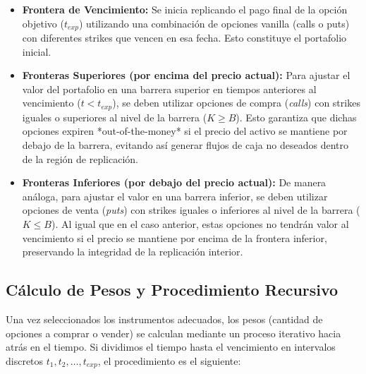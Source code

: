 \begin{itemize} 
  \item \textbf{Frontera de Vencimiento:} Se inicia replicando el pago final de la opción objetivo ($t_{exp}$) utilizando una combinación de opciones vanilla (calls o puts) con diferentes strikes que vencen en esa fecha. Esto constituye el portafolio inicial.
  
  \item \textbf{Fronteras Superiores (por encima del precio actual):} Para ajustar el valor del portafolio en una barrera superior en tiempos anteriores al vencimiento ($t < t_{exp}$), se deben utilizar opciones de compra (\textit{calls}) con strikes iguales o superiores al nivel de la barrera ($K \geq B$). Esto garantiza que dichas opciones expiren *out-of-the-money* si el precio del activo se mantiene por debajo de la barrera, evitando así generar flujos de caja no deseados dentro de la región de replicación.
  \item \textbf{Fronteras Inferiores (por debajo del precio actual):} De manera análoga, para ajustar el valor en una barrera inferior, se deben utilizar opciones de venta (\textit{puts}) con strikes iguales o inferiores al nivel de la barrera ($K \leq B$). Al igual que en el caso anterior, estas opciones no tendrán valor al vencimiento si el precio se mantiene por encima de la frontera inferior, preservando la integridad de la replicación interior.
\end{itemize}

\subsection{Cálculo de Pesos y Procedimiento Recursivo}

Una vez seleccionados los instrumentos adecuados, los pesos (cantidad de opciones a comprar o vender) se calculan mediante un proceso iterativo hacia atrás en el tiempo. Si dividimos el tiempo hasta el vencimiento en intervalos discretos $t_1,t_2,…,t_{exp}$, el procedimiento es el siguiente:

